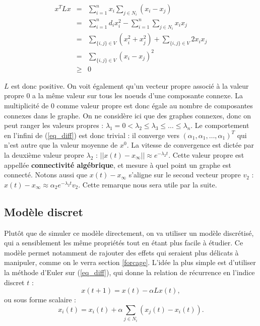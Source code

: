 \documentclass[12pt]{article}
\begin{document}
\begin{eqnarray*}
  x^T L x & = & \sum_{i = 1}^n x_i \sum_{j \in N_i} (x_i - x_j) \\
  & = & \sum_{i = 1}^n d_i x_i^2 - \sum_{i = 1}^n \sum_{j \in N_i} x_i x_j \\
  & = & \sum_{\{i, j\} \in V} (x_i^2 + x_j^2) + \sum_{\{i, j\} \in V} 2 x_i x_j \\
  & = & \sum_{\{i, j\} \in V} (x_i - x_j)^2 \\
  & \geq & 0
\end{eqnarray*}

$L$ est donc positive. On voit également qu'un vecteur propre associé
à la valeur propre $0$ a la même valeur sur tous les noeuds d'une
composante connexe. La multiplicité de $0$ comme valeur propre est
donc égale au nombre de composantes connexes dans le graphe. On ne
considère ici que des graphes connexes, donc on peut ranger les
valeurs propres : $\lambda_1 = 0 < \lambda_2 \leq \lambda_3 \leq \dots
\leq \lambda_n$. Le comportement en l'infini de (\ref{eq_diff}) est
donc trivial : il converge vers $(\alpha_1, \alpha_1, \dots,
\alpha_1)^T$ qui n'est autre que la valeur moyenne de $x^0$. La
vitesse de convergence est dictée par la deuxième valeur propre
$\lambda_2$ : $||x(t) - x_\infty|| \approx e^{-\lambda_2 t}$. Cette
valeur propre est appellée {\bf connectivité algébrique}, et mesure à
quel point un graphe est connecté. Notons aussi que $x(t) - x_\infty$
s'aligne sur le second vecteur propre $v_2$ : $x(t) - x_\infty \approx
\alpha_2 e^{-\lambda_2 t} v_2$. Cette remarque nous sera utile par la
suite.

\subsection{Modèle discret}
\label{mod_discret}
Plutôt que de simuler ce modèle directement, on va utiliser un modèle
discrétisé, qui a sensiblement les même propriétés tout en étant plus
facile à étudier. Ce modèle permet notamment de rajouter des effets
qui seraient plus délicats à manipuler, comme on le verra section
\ref{forcage}. L'idée la plus simple est d'utiliser la méthode d'Euler
sur (\ref{eq_diff}), qui donne la relation de récurrence en l'indice
discret $t$ :
\begin{equation}
 \label{eq_discrete}
 x(t+1) = x(t) - \alpha L x(t),
\end{equation}
ou sous forme scalaire :
\begin{equation}
 \label{eq_discrete_scal}
 x_i(t) = x_i(t) + \alpha \sum_{j \in N_i} (x_j(t) - x_i(t)).
\end{equation}
\end{document}
